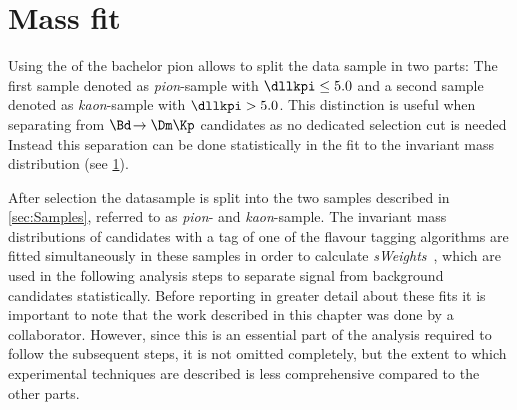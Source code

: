 \chapter{Mass fit}
\label{ch:massfit}

\linespread{1.08}\selectfont
Using the \dllkpi of the bachelor pion allows to split the data sample in two parts: The first sample denoted as \emph{pion}-sample with $\dllkpi\leq5.0$ and a second sample denoted as \emph{kaon}-sample with $\dllkpi>5.0$. This distinction is useful when separating \BdToDpi from $\Bd\!\to\Dm\Kp$ candidates as no dedicated selection cut is needed
Instead this separation can be done statistically in the fit to the invariant mass distribution (see \cref{ch:massfit}).


After selection the datasample is split into the two samples described in \cref{sec:Samples}, referred to as \emph{pion}- and \emph{kaon}-sample.
The invariant \Bz mass distributions of candidates with a tag of one of the flavour tagging algorithms are fitted simultaneously in these samples in order to calculate \emph{sWeights}~\cite{Pivk:2004ty}, which are used in the following analysis steps to separate signal from background candidates statistically.
Before reporting in greater detail about these fits it is important to note that the work described in this chapter was done by a collaborator.
However, since this is an essential part of the analysis required to follow the subsequent steps, it is not omitted completely, but the extent to which \eg experimental techniques are described is less comprehensive compared to the other parts.

